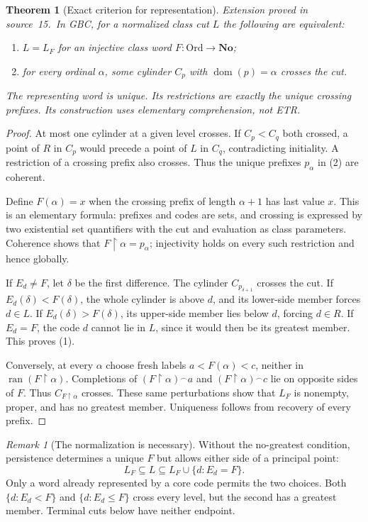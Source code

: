 \documentclass[11pt]{article}
\newtheorem{theorem}{Theorem}[section]
\theoremstyle{definition}
\theoremstyle{remark}
\newtheorem{remark}[remark]{Remark}
\newcommand{\No}{\mathbf{No}}
\newcommand{\Ord}{\mathrm{Ord}}
\newcommand{\ran}{\operatorname{ran}}
\newcommand{\dom}{\operatorname{dom}}
\newcommand{\concat}{\mathbin{{}^\frown}}
\newcommand{\res}{\mathbin{\upharpoonright}}
\begin{document}
\begin{theorem}[Exact criterion for representation]\label{swo:cb:thm:cutcriterion}
\textit{Extension proved in source~15.}\ In GBC, for a normalized class cut $L$ the following are
equivalent:
\begin{enumerate}
\item $L=L_F$ for an injective class word $F:\Ord\to\No$;
\item for every ordinal $\alpha$, some cylinder $C_p$ with
      $\dom(p)=\alpha$ crosses the cut.
\end{enumerate}
The representing word is unique. Its restrictions are exactly the unique
crossing prefixes. Its construction uses elementary comprehension, not ETR.
\end{theorem}
\begin{proof}
At most one cylinder at a given level crosses. If $C_p<C_q$ both crossed,
a point of $R$ in $C_p$ would precede a point of $L$ in $C_q$,
contradicting initiality. A restriction of a crossing prefix also
crosses. Thus the unique prefixes $p_\alpha$ in (2) are coherent.

Define $F(\alpha)=x$ when the crossing prefix of length $\alpha+1$
has last value $x$. This is an elementary formula: prefixes and codes
are sets, and crossing is expressed by two existential set quantifiers
with the cut and evaluation as class parameters. Coherence shows that
$F\res\alpha=p_\alpha$; injectivity holds on every such restriction
and hence globally.

If $E_d\ne F$, let $\delta$ be the first difference. The cylinder
$C_{p_{\delta+1}}$ crosses the cut. If $E_d(\delta)<F(\delta)$,
the whole cylinder is above $d$, and its lower-side member forces
$d\in L$. If $E_d(\delta)>F(\delta)$, its upper-side member lies
below $d$, forcing $d\in R$. If $E_d=F$, the code $d$ cannot lie
in $L$, since it would then be its greatest member. This proves (1).

Conversely, at every $\alpha$ choose fresh labels
$a<F(\alpha)<c$, neither in $\ran(F\res\alpha)$. Completions of
$(F\res\alpha)\concat a$ and $(F\res\alpha)\concat c$ lie on
opposite sides of $F$. Thus $C_{F\res\alpha}$ crosses. These same
perturbations show that $L_F$ is nonempty, proper, and has no greatest
member. Uniqueness follows from recovery of every prefix.
\end{proof}

\begin{remark}[The normalization is necessary]\label{swo:cb:n7.3}
Without the no-greatest condition, persistence determines a unique $F$
but allows either side of a principal point:
\[
 L_F\subseteq L\subseteq L_F\cup\{d:E_d=F\}.
\]
Only a word already represented by a core code permits the two choices.
Both $\{d:E_d<F\}$ and $\{d:E_d\leq F\}$ cross every level, but
the second has a greatest member. Terminal cuts below have neither endpoint.
\end{remark}
\end{document}
